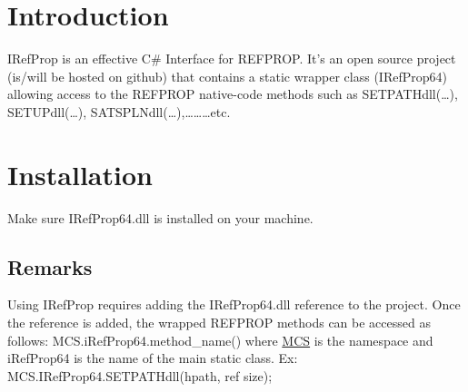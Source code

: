 \hypertarget{index_intro_sec}{}\section{Introduction}\label{index_intro_sec}
I\+Ref\+Prop is an effective C\# Interface for R\+E\+F\+P\+R\+OP. It’s an open source project (is/will be hosted on github) that contains a static wrapper class (I\+Ref\+Prop64) allowing access to the R\+E\+F\+P\+R\+OP native-\/code methods such as S\+E\+T\+P\+A\+T\+Hdll(…), S\+E\+T\+U\+Pdll(…), S\+A\+T\+S\+P\+L\+Ndll(…),………etc.\hypertarget{index_install_sec}{}\section{Installation}\label{index_install_sec}
Make sure I\+Ref\+Prop64.\+dll is installed on your machine. \hypertarget{index_step1}{}\subsection{Remarks}\label{index_step1}
Using I\+Ref\+Prop requires adding the I\+Ref\+Prop64.\+dll reference to the project. Once the reference is added, the wrapped R\+E\+F\+P\+R\+OP methods can be accessed as follows\+: M\+C\+S.\+i\+Ref\+Prop64.\+method\+\_\+name() where \hyperlink{namespace_m_c_s}{M\+CS} is the namespace and i\+Ref\+Prop64 is the name of the main static class. Ex\+: M\+C\+S.\+I\+Ref\+Prop64.\+S\+E\+T\+P\+A\+T\+Hdll(hpath, ref size); 